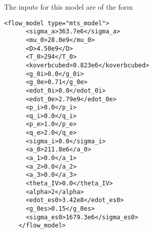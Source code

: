   The inputs for this model are of the form
  \begin{Verbatim}[fontsize=\footnotesize]
    <flow_model type="mts_model">
      <sigma_a>363.7e6</sigma_a>
      <mu_0>28.0e9</mu_0>
      <D>4.50e9</D>
      <T_0>294</T_0>
      <koverbcubed>0.823e6</koverbcubed>
      <g_0i>0.0</g_0i>
      <g_0e>0.71</g_0e>
      <edot_0i>0.0</edot_0i>
      <edot_0e>2.79e9</edot_0e>
      <p_i>0.0</p_i>
      <q_i>0.0</q_i>
      <p_e>1.0</p_e>
      <q_e>2.0</q_e>
      <sigma_i>0.0</sigma_i>
      <a_0>211.8e6</a_0>
      <a_1>0.0</a_1>
      <a_2>0.0</a_2>
      <a_3>0.0</a_3>
      <theta_IV>0.0</theta_IV>
      <alpha>2</alpha>
      <edot_es0>3.42e8</edot_es0>
      <g_0es>0.15</g_0es>
      <sigma_es0>1679.3e6</sigma_es0>
    </flow_model>
  \end{Verbatim}

